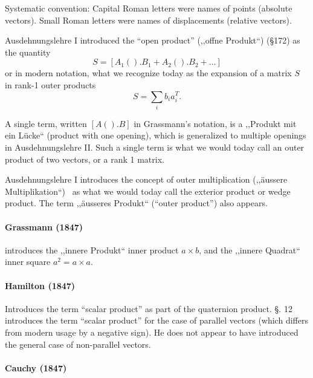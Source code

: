 Systematic convention: Capital Roman letters were names of points (absolute
vectors). Small Roman letters were names of displacements (relative vectors).

Ausdehnungslehre I introduced the ``open product'' (,,offne Produkt``) (\S 172) as the quantity
\[
S = [A_1().B_1 + A_2().B_2 + \dots]
\]
%
or in modern notation, what we recognize today as the expansion of a matrix $S$ in rank-1 outer products
\[
S = \sum_i b_i a_i^T.
\]

A single term, written $[A().B]$ in Grassmann's notation, is a ,,Produkt mit
ein Lücke`` (product with one opening), which is generalized to multiple
openings in Ausdehnungslehre II. Such a single term is what we would today call
an outer product of two vectors, or a rank 1 matrix.

Ausdehnungslehre I introduces the concept of outer multiplication (,,äussere
Multiplikation``)~\cite[\S 34, p.57]{Grassmann1844}\cite[p. 81]{Grassmann1995}
as what we would today call the exterior product or wedge product. The term
,,äusseres Produkt``\cite[\S 36, p. 60]{Grassmann1844} (``outer
product''\cite[p. 84]{Grassmann1995}) also appears.

\paragraph{Grassmann (1847)~\cite{Grassmann1847,Grassmann1995}}

\cite[p. 16]{Grassmann1847}\cite[\S 7, p. 334]{Grassmann1995} introduces the
 ,,innere Produkt`` inner product $a \times b$, and the
 ,,innere Quadrat`` inner square $a^2 = a \times a$.



\paragraph{Hamilton (1847)~\cite{Hamilton1847}}

Introduces the term ``scalar product'' as part of the quaternion product.
\S. 12 introduces the term ``scalar product'' for the case of parallel vectors (which differs from modern usage by a negative sign).
He does not appear to have introduced the general case of non-parallel vectors.



\paragraph{Cauchy (1847)~\cite{Cauchy1847}}


